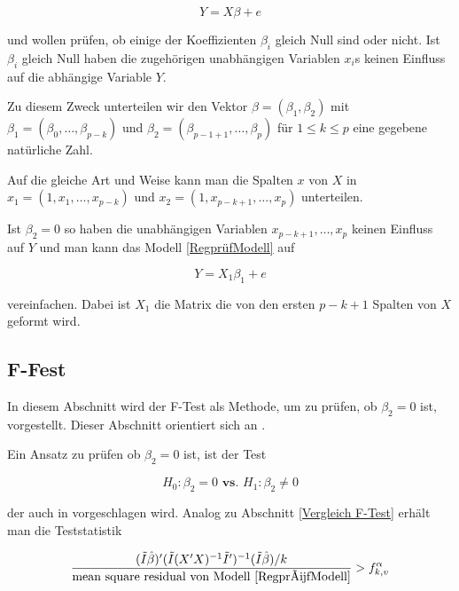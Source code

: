 \documentclass[12pt,a4paper]{article}
\theoremstyle{definition}
\theoremstyle{definition}
\theoremstyle{definition}
\begin{document}
\begin{equation} \label{RegprüfModell}
Y=X \beta + e
\end{equation}

und wollen prüfen, ob einige der Koeffizienten $\beta_i$ gleich Null sind oder nicht. Ist $\beta_i$ gleich Null haben die zugehörigen unabhängigen Variablen $x_i$s keinen Einfluss auf die abhängige Variable $Y$. 

Zu diesem Zweck unterteilen wir den Vektor $\beta=(\beta_1,\beta_2)$ mit $\beta_1=(\beta_0, \ldots, \beta_{p-k})$ und $\beta_2=(\beta_{p-1+1}, \ldots, \beta_{p})$ für $1 \leq k \leq p$ eine gegebene natürliche Zahl. 

Auf die gleiche Art und Weise kann man die Spalten $x$ von $X$ in $x_1=(1,x_1, \ldots, x_{p-k})$ und $x_2=(1,x_{p-k+1}, \ldots, x_{p})$ unterteilen.

Ist $\beta_2=0$ so haben die unabhängigen Variablen $x_{p-k+1}, \ldots, x_p$ keinen Einfluss auf $Y$ und man kann das Modell \ref{RegprüfModell} auf 

\begin{equation}
Y=X_1 \beta_1 + e
\end{equation}

vereinfachen. Dabei ist $X_1$ die Matrix die von den ersten $p-k+1$ Spalten von $X$ geformt wird.

\subsection{F-Fest}
\label{F-Test-Teil}
In diesem Abschnitt wird der F-Test als Methode, um zu prüfen, ob $\beta_2=0$ ist, vorgestellt. Dieser Abschnitt orientiert sich an \cite[100-102]{Liu64}.

Ein Ansatz zu prüfen ob $\beta_2=0$ ist, ist der Test 

\begin{equation} \label{Test_prüfen}
H_{0} : \beta_{2} = 0  \textbf{ vs. }  H_{1} : \beta_{2} \neq 0
\end{equation}

der auch in \cite{Draper98} vorgeschlagen wird. Analog zu Abschnitt \ref{Vergleich F-Test} erhält man die Teststatistik

\begin{equation*}
\frac{(\tilde{I}\hat{\beta})'(\tilde{I}(X'X)^{-1}\tilde{I}')^{-1}(\tilde{I}\hat{\beta})/k}{\text{mean square residual von Modell \ref{RegprüfModell}}} > f^{\alpha}_{k,v}
\end{equation*}
\end{document}
